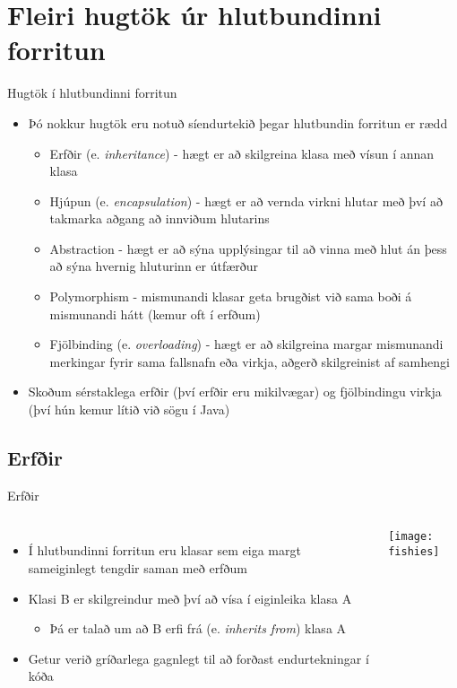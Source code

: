 \documentclass[handout]{beamer}
\begin{document}
\section{Fleiri hugtök úr hlutbundinni forritun}

\begin{frame}{Hugtök í hlutbundinni forritun}
\begin{itemize}
 \item Þó nokkur hugtök eru notuð síendurtekið þegar hlutbundin forritun er rædd
 \begin{itemize}
  \item Erfðir (e. \emph{inheritance}) - hægt er að skilgreina klasa með vísun í annan klasa
  \item Hjúpun (e. \emph{encapsulation}) - hægt er að vernda virkni hlutar með því að takmarka aðgang að innviðum hlutarins
  \item Abstraction - hægt er að sýna upplýsingar til að vinna með hlut án þess að sýna hvernig hluturinn er útfærður
  \item Polymorphism - mismunandi klasar geta brugðist við sama boði á mismunandi hátt (kemur oft í erfðum)
  \item Fjölbinding (e. \emph{overloading}) - hægt er að skilgreina margar mismunandi merkingar fyrir sama fallsnafn eða virkja, aðgerð skilgreinist af samhengi
 \end{itemize}
 \item Skoðum sérstaklega erfðir (því erfðir eru mikilvægar) og fjölbindingu virkja (því hún kemur lítið við sögu í Java)
\end{itemize}
\end{frame}

\subsection{Erfðir}

\begin{frame}{Erfðir}
\begin{columns}
\begin{itemize}
 \item Í hlutbundinni forritun eru klasar sem eiga margt sameiginlegt tengdir saman með erfðum
 \item Klasi B er skilgreindur með því að vísa í eiginleika klasa A
 \begin{itemize}
  \item Þá er talað um að B erfi frá (e. \emph{inherits from}) klasa A
 \end{itemize}
 \item Getur verið gríðarlega gagnlegt til að forðast endurtekningar í kóða
\end{itemize}
\texttt{[image: fishies]}
\end{columns}
\end{frame}
\end{document}
